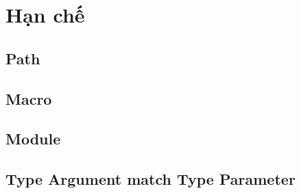 \section{Hạn chế}

\subsection{Path}

\subsection{Macro}

\subsection{Module}

\subsection{Type Argument match Type Parameter}

